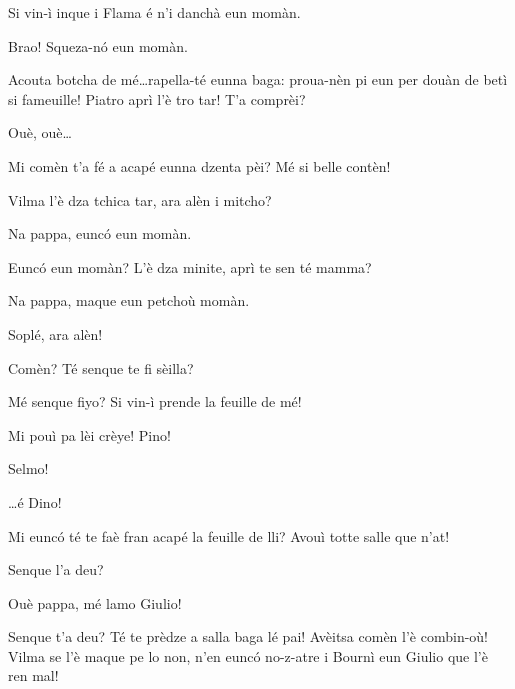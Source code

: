 \begin{drama}
\Giuliospeaks{} Si vin-ì inque i Flama é n'i danchà eun momàn.

\Selmospeaks Brao!  Squeza-n\'o eun momàn.


\Selmospeaks{} Acouta botcha de mé\ldots rapella-té eunna baga: proua-nèn pi eun per douàn de betì si fameuille! Piatro aprì l'è tro tar! T'a comprèi?

\Giuliospeaks Ouè, ouè\ldots

\Selmospeaks{} Mi comèn t'a fé a acapé eunna dzenta pèi? Mé si belle contèn!


\Pinospeaks Vilma l’è dza tchica tar, ara alèn i mitcho?

\Vilmaspeaks Na pappa, eunc\'o eun momàn.

\Pinospeaks Eunc\'o eun momàn? L'è dza minite, aprì te sen té mamma?

\Vilmaspeaks Na pappa, maque eun petchoù momàn.

\Pinospeaks Soplé, ara alèn!


\Selmospeaks Comèn? Té senque te fi sèilla?

\Pinospeaks{} Mé senque fiyo? Si vin-ì prende la feuille de mé!

\Selmospeaks{} Mi pouì pa lèi crèye! Pino!

\Pinospeaks Selmo!

\Dinospeaks \ldots é Dino!

\Selmospeaks{} Mi eunc\'o té te faè fran acapé la feuille de lli? Avouì totte salle que n'at!

\Pinospeaks{} Senque l'a deu?

\Vilmaspeaks Ouè pappa, mé lamo Giulio!

\Pinospeaks{} Senque t'a deu? Té te prèdze a salla baga  lé pai! Avèitsa comèn l'è combin-où! Vilma se l'è maque pe lo non, n'en eunc\'o no-z-atre i Bournì eun Giulio que l'è ren mal!


\end{drama}
